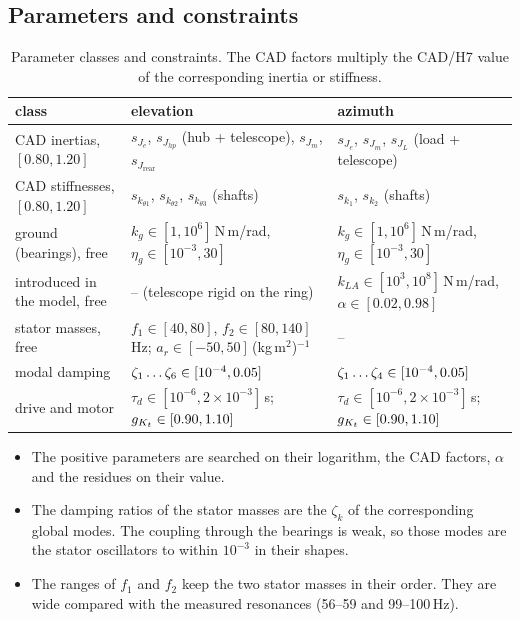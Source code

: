\documentclass[10pt,a4paper]{article}
\numberwithin{equation}{section}
\begin{document}
\subsection{Parameters and constraints}
\begin{table}[H]\centering\small
\caption{Parameter classes and constraints. The CAD factors multiply the CAD/H7 value of the corresponding inertia or stiffness.}\label{tab:constraints}
\begin{tabular}{L{3.4cm}L{6.0cm}L{6.2cm}}\toprule
class & elevation & azimuth \\ \midrule
CAD inertias, $[0.80,1.20]$ & $s_{J_e}$, $s_{J_{hp}}$ (hub + telescope), $s_{J_m}$, $s_{J_\mathrm{rear}}$ & $s_{J_e}$, $s_{J_m}$, $s_{J_L}$ (load + telescope) \\
CAD stiffnesses, $[0.80,1.20]$ & $s_{k_{\theta1}}$, $s_{k_{\theta2}}$, $s_{k_{\theta3}}$ (shafts) & $s_{k_1}$, $s_{k_2}$ (shafts) \\
ground (bearings), free & $k_g\in[1,10^6]$\,N\,m/rad, $\eta_g\in[10^{-3},30]$ & $k_g\in[1,10^6]$\,N\,m/rad, $\eta_g\in[10^{-3},30]$ \\
introduced in the model, free & -- (telescope rigid on the ring) & $k_{LA}\in[10^3,10^8]$\,N\,m/rad, $\alpha\in[0.02,0.98]$ \\
stator masses, free & $f_1\in[40,80]$, $f_2\in[80,140]$\,Hz; $a_r\in[-50,50]$\,(kg\,m$^2$)$^{-1}$ & -- \\
modal damping & $\zeta_1\dots\zeta_6\in[10^{-4},0.05]$ & $\zeta_1\dots\zeta_4\in[10^{-4},0.05]$ \\
drive and motor & $\tau_d\in[10^{-6},2\times10^{-3}]$\,s; $g_{K_t}\in[0.90,1.10]$ & $\tau_d\in[10^{-6},2\times10^{-3}]$\,s; $g_{K_t}\in[0.90,1.10]$ \\ \bottomrule
\end{tabular}\end{table}
\begin{itemize}
\item The positive parameters are searched on their logarithm, the CAD factors, $\alpha$ and the residues on their value.
\item The damping ratios of the stator masses are the $\zeta_k$ of the corresponding global modes. The coupling through the bearings is weak, so those modes are the stator oscillators to within $10^{-3}$ in their shapes.
\item The ranges of $f_1$ and $f_2$ keep the two stator masses in their order. They are wide compared with the measured resonances (56--59 and 99--100\,Hz).
\end{itemize}
\end{document}
